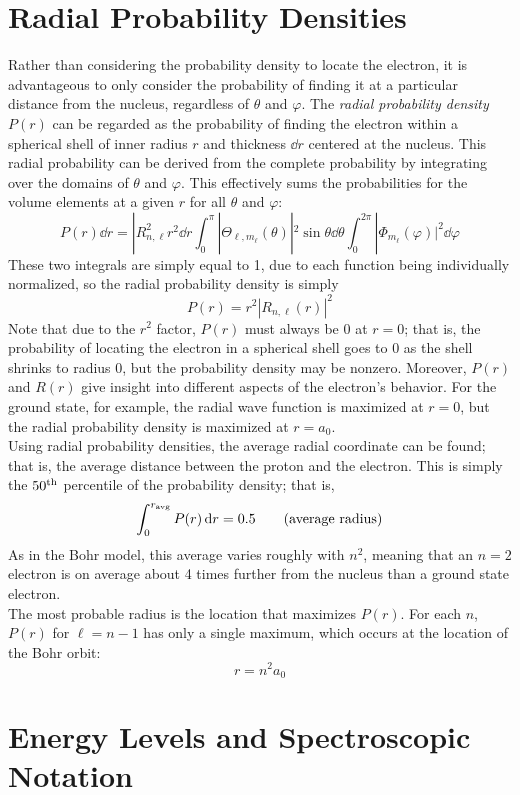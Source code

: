 \documentclass{subfiles}
\begin{document}
	\section{Radial Probability Densities}
		Rather than considering the probability density to locate the electron, it is advantageous to only consider the probability of finding it at a particular distance from the nucleus, regardless of \(\theta\) and \(\varphi\). The \textit{radial probability density \(P(r)\)} can be regarded as the probability of finding the electron within a spherical shell of inner radius \(r\) and thickness \(\dd{r}\) centered at the nucleus. This radial probability can be derived from the complete probability by integrating over the domains of \(\theta\) and \(\varphi\). This effectively sums the probabilities for the volume elements at a given \(r\) for all \(\theta\) and \(\varphi\):
			\[P(r)\dd{r} = |R_{n, \ell}^2r^2\dd{r}\int_0^\pi|\Theta_{\ell, m_\ell}(\theta)|^2\sin\theta\dd{\theta}\int_0^{2\pi}|\Phi_{m_\ell}(\varphi)|^2\dd{\varphi}\]
			These two integrals are simply equal to 1, due to each function being individually normalized, so the radial probability density is simply
			\[
				P(r) = r^2|R_{n, \ell}(r)|^2
					\tag{radial probability density}
			\]
			Note that due to the \(r^2\) factor, \(P(r)\) must always be 0 at \(r = 0\); that is, the probability of locating the electron in a spherical shell goes to 0 as the shell shrinks to radius 0, but the probability density may be nonzero. Moreover, \(P(r)\) and \(R(r)\) give insight into different aspects of the electron's behavior. For the ground state, for example, the radial wave function is maximized at \(r = 0\), but the radial probability density is maximized at \(r = a_0\). \\
		Using radial probability densities, the average radial coordinate can be found; that is, the average distance between the proton and the electron. This is simply the \(50^{\text{th}}\) percentile of the probability density; that is,
			\[
				\int_0^{r_{\text{avg}}}P(r)\dd{r} = 0.5
					\tag{average radius}
			\]
			As in the Bohr model, this average varies roughly with \(n^2\), meaning that an \(n = 2\) electron is on average about 4 times further from the nucleus than a ground state electron. \\
		The most probable radius is the location that maximizes \(P(r)\). For each \(n\), \(P(r)\) for \(\ell = n - 1\) has only a single maximum, which occurs at the location of the Bohr orbit:
			\[
				r = n^2a_0
					\tag{most probable radius}
			\]
	\setcounter{section}{6}
	\section{Energy Levels and Spectroscopic Notation}
		
\end{document}
